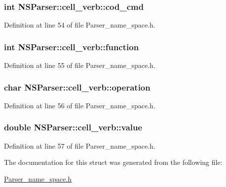 \subsubsection[{cod\+\_\+cmd}]{\setlength{\rightskip}{0pt plus 5cm}int N\+S\+Parser\+::cell\+\_\+verb\+::cod\+\_\+cmd}\label{structNSParser_1_1cell__verb_a71c80dd322f510111134723368aa4470}


Definition at line 54 of file Parser\+\_\+name\+\_\+space.\+h.

\hypertarget{structNSParser_1_1cell__verb_ae01137555ad15a3c3cd22018588c5c1d}{}
\subsubsection[{function}]{\setlength{\rightskip}{0pt plus 5cm}int N\+S\+Parser\+::cell\+\_\+verb\+::function}\label{structNSParser_1_1cell__verb_ae01137555ad15a3c3cd22018588c5c1d}


Definition at line 55 of file Parser\+\_\+name\+\_\+space.\+h.

\hypertarget{structNSParser_1_1cell__verb_a41d5d55651956c9d353f33b1aedb1fb2}{}
\subsubsection[{operation}]{\setlength{\rightskip}{0pt plus 5cm}char N\+S\+Parser\+::cell\+\_\+verb\+::operation}\label{structNSParser_1_1cell__verb_a41d5d55651956c9d353f33b1aedb1fb2}


Definition at line 56 of file Parser\+\_\+name\+\_\+space.\+h.

\hypertarget{structNSParser_1_1cell__verb_a8b0aa5da814292043c02ac6bd7544a6f}{}
\subsubsection[{value}]{\setlength{\rightskip}{0pt plus 5cm}double N\+S\+Parser\+::cell\+\_\+verb\+::value}\label{structNSParser_1_1cell__verb_a8b0aa5da814292043c02ac6bd7544a6f}


Definition at line 57 of file Parser\+\_\+name\+\_\+space.\+h.



The documentation for this struct was generated from the following file\+:\begin{DoxyCompactItemize}
\item 
\hyperlink{Parser__name__space_8h}{Parser\+\_\+name\+\_\+space.\+h}\end{DoxyCompactItemize}
